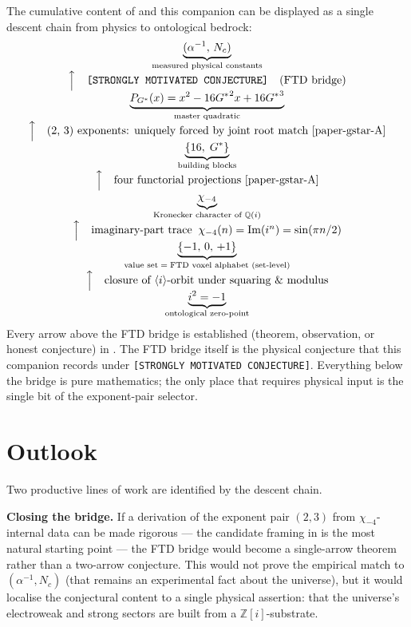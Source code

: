 \documentclass[11pt]{amsart}
\theoremstyle{plain}
\theoremstyle{definition}
\theoremstyle{remark}
\newcommand{\Gs}{G^{*}}
\newcommand{\Gss}{{G^{*}}^{2}}
\newcommand{\Gsss}{{G^{*}}^{3}}
\newcommand{\Z}{\mathbb{Z}}
\newcommand{\Q}{\mathbb{Q}}
\begin{document}
The cumulative content of \cite{paper-gstar-A} and this companion can be
displayed as a single descent chain from physics to ontological bedrock:
\[
\begin{array}{c}
\underbrace{(\alpha^{-1},\, N_{c})}_{\text{measured physical constants}} \\
\Big\uparrow \text{\quad\texttt{[STRONGLY MOTIVATED CONJECTURE]}\quad (FTD bridge)} \\
\underbrace{P_{\Gs}(x) = x^{2} - 16\Gss x + 16\Gsss}_{\text{master quadratic}} \\
\Big\uparrow \text{\quad(2, 3) exponents: uniquely forced by joint root match \cite[\S 16.6]{paper-gstar-A}} \\
\underbrace{\{16,\; \Gs\}}_{\text{building blocks}} \\
\Big\uparrow \text{\quad four functorial projections \cite[Thm 16.2]{paper-gstar-A}} \\
\underbrace{\chi_{-4}}_{\text{Kronecker character of } \Q(i)} \\
\Big\uparrow \text{\quad imaginary-part trace}\;\; \chi_{-4}(n) = \mathrm{Im}(i^{n}) = \sin(\pi n/2) \\
\underbrace{\{-1,\, 0,\, +1\}}_{\text{value set} \;=\; \text{FTD voxel alphabet (set-level)}} \\
\Big\uparrow \text{\quad closure of }\langle i\rangle\text{-orbit under squaring \& modulus} \\
\underbrace{i^{2} = -1}_{\text{ontological zero-point}}
\end{array}
\]
Every arrow above the FTD bridge is established (theorem, observation,
or honest conjecture) in \cite{paper-gstar-A}. The FTD bridge itself is
the physical conjecture that this companion records under
\texttt{[STRONGLY MOTIVATED CONJECTURE]}. Everything below the bridge is
pure mathematics; the only place that requires physical input is the
single bit of the exponent-pair selector.

\section{Outlook}\label{sec:outlook}

Two productive lines of work are identified by the descent chain.

\textbf{Closing the bridge.} If a derivation of the exponent pair
$(2, 3)$ from $\chi_{-4}$-internal data can be made rigorous --- the
candidate framing in \cite[\S 16.5, Theorem (Sym\textsuperscript{2}--Sym\textsuperscript{3} uniqueness, leading-period)]{paper-gstar-A}
is the most natural starting point --- the FTD bridge would become a
single-arrow theorem rather than a two-arrow conjecture. This would
not prove the empirical match to $(\alpha^{-1}, N_{c})$ (that remains an
experimental fact about the universe), but it would localise the
conjectural content to a single physical assertion: that the universe's
electroweak and strong sectors are built from a $\Z[i]$-substrate.
\end{document}
